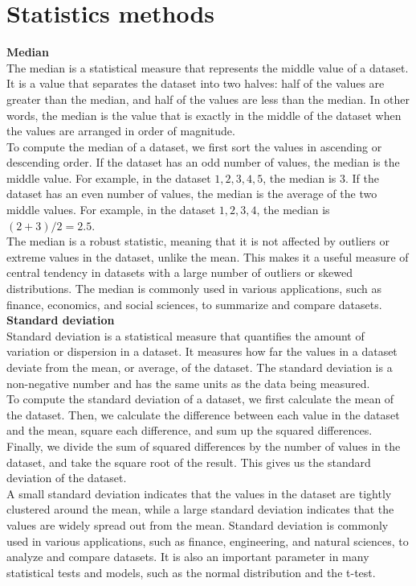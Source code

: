 \section{Statistics methods} \label{subsec:statistics}
\textbf{Median}\\
The median is a statistical measure that represents the middle value of a dataset. It is a value that separates the dataset
into two halves: half of the values are greater than the median, and half of the values are less than the median. In other words,
the median is the value that is exactly in the middle of the dataset when the values are arranged in order of magnitude.
\\
To compute the median of a dataset, we first sort the values in ascending or descending order. If the dataset has an odd number of values,
the median is the middle value. For example, in the dataset ${1, 2, 3, 4, 5}$, the median is $3$.
If the dataset has an even number of values, the median is the average of the two middle values.
For example, in the dataset ${1, 2, 3, 4}$, the median is $(2 + 3) / 2 = 2.5$.
\\
The median is a robust statistic, meaning that it is not affected by outliers or extreme values in the dataset,
unlike the mean. This makes it a useful measure of central tendency in datasets with a large number of outliers or
skewed distributions. The median is commonly used in various applications, such as finance, economics, and social sciences,
to summarize and compare datasets.
\\
\textbf{Standard deviation}\\
Standard deviation is a statistical measure that quantifies the amount of variation or dispersion in a dataset.
It measures how far the values in a dataset deviate from the mean, or average, of the dataset. The standard
deviation is a non-negative number and has the same units as the data being measured.
\\
To compute the standard deviation of a dataset, we first calculate the mean of the dataset.
Then, we calculate the difference between each value in the dataset and the mean, square each difference, and sum up the
squared differences. Finally, we divide the sum of squared differences by the number of values in the dataset, and take the
square root of the result. This gives us the standard deviation of the dataset.
\\
A small standard deviation indicates that the values in the dataset are tightly clustered around the mean,
while a large standard deviation indicates that the values are widely spread out from the mean. Standard deviation is commonly
used in various applications, such as finance, engineering, and natural sciences, to analyze and compare datasets.
It is also an important parameter in many statistical tests and models, such as the normal distribution and the t-test.
